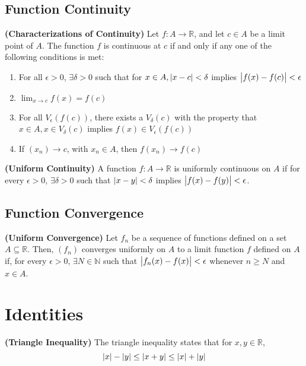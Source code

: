 \subsection{Function Continuity}
\begin{theorem}
  \textbf{\textup{(Characterizations of Continuity)}}
  Let $f : A \to \mathbb{R}$, and let $c \in A$ be a limit point of $A$.
  The function $f$ is continuous at $c$ if and only if any one of the following 
  conditions is met:
  \begin{enumerate}[label=(\roman*)]
    \item For all $\epsilon > 0$, $\exists \delta > 0$ such that for $x \in A, \abs{x - c} < \delta$
    implies $\abs{f(x) - f(c)} < \epsilon$
    \item $\lim_{x \to c} f(x) = f(c)$
    \item For all $V_\epsilon(f(c))$, there exists a $V_\delta(c)$ with the property that 
    $x \in A, x \in V_\delta(c)$ implies $f(x) \in V_\epsilon(f(c))$
    \item If $(x_n) \to c$, with $x_n \in A$, then $f(x_n) \to f(c)$
  \end{enumerate}
\end{theorem}

\begin{theorem}
  \textbf{\textup{(Uniform Continuity)}}
  A function $f:A\to \mathbb{R}$ is uniformly continuous on $A$
  if for every $\epsilon > 0$, $\exists \delta > 0$
  such that $\abs{x - y} < \delta$ implies $\abs{f(x) - f(y)} < \epsilon$.
\end{theorem}

\subsection{Function Convergence}
\begin{definition}
  \textbf{\textup{(Uniform Convergence)}}
  Let $f_n$ be a sequence of functions defined on a set $A \subseteq \mathbb{R}$.
  Then, $(f_n)$ converges uniformly on $A$ to a limit function $f$
  defined on $A$ if, for every $\epsilon > 0$, $\exists N \in \mathbb{N}$
  such that $\abs{f_n(x) - f(x)} < \epsilon$ whenever $n \geq N$ and $x \in A$.
\end{definition}

\section{Identities}
\begin{identity}
  \textbf{\textup{(Triangle Inequality)}}
  The triangle inequality states that for $x, y \in \mathbb{R}$,
  \begin{equation}
    \abs{x} - \abs{y} \leq \abs{x + y} \leq \abs{x} + \abs{y}
  \end{equation}
\end{identity}

